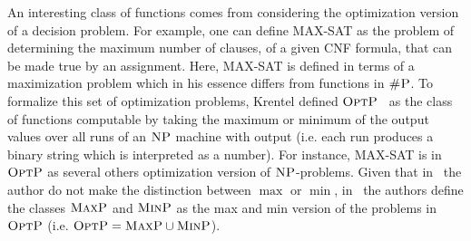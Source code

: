 An interesting class of functions comes from considering the optimization version of a decision problem. For example, one can define MAX-SAT as the problem of determining the maximum number of clauses, of a given CNF formula, that can be made true by an assignment. Here, MAX-SAT is defined in terms of a maximization problem which in his essence differs from functions in $\text{\sc \#P}$. 
To formalize this set of optimization problems, Krentel defined $\text{\sc OptP}$~\cite{krentel1988complexity} as the class of functions computable by taking the maximum or minimum of the output values over all runs of an $\text{\sc NP}$ machine with output (i.e. each run produces a binary string which is interpreted as a number). 
For instance, MAX-SAT is in $\text{\sc OptP}$ as several others optimization version of $\text{\sc NP}$-problems.
Given that in~\cite{krentel1988complexity} the author do not make the distinction between $\max$ or $\min$, in~\cite{vollmer1995complexity} the authors define the classes $\text{\sc MaxP}$ and $\text{\sc MinP}$ as the max and min version of the problems in $\text{\sc OptP}$ (i.e. $\text{\sc OptP} = \text{\sc MaxP} \cup \text{\sc MinP}$).


